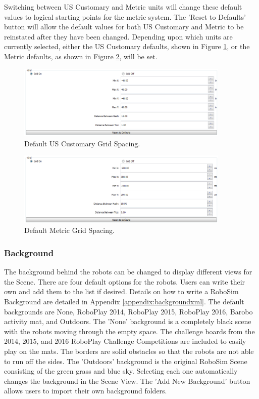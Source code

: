 \documentclass{article}
\begin{document}
Switching between US Customary and Metric units will change these default values
to logical starting points for the metric system.  The 'Reset to Defaults'
button will allow the default values for both US Customary and Metric to be
reinstated after they have been changed.  Depending upon which units are
currently selected, either the US Customary defaults, shown in Figure
\ref{fig:grid_us}, or the Metric defaults, as shown in Figure
\ref{fig:grid_metric}, will be set.
\begin{figure}[H]
	\begin{center}
		\includegraphics[width=4in]{pictures/gui_grid_us}
	\end{center}
	\caption{Default US Customary Grid Spacing.}
	\label{fig:grid_us}
\end{figure}
\begin{figure}[H]
	\begin{center}
		\includegraphics[width=4in]{pictures/gui_grid_si}
	\end{center}
	\caption{Default Metric Grid Spacing.}
	\label{fig:grid_metric}
\end{figure}

\subsubsection{Background}
The background behind the robots can be changed to display different views for
the Scene.  There are four default options for the robots.  Users can write
their own and add them to the list if desired.  Details on how to write a
RoboSim Background are detailed in Appendix \ref{appendix:backgroundxml}.  The
default backgrounds are None, RoboPlay 2014, RoboPlay 2015, RoboPlay 2016,
Barobo activity mat, and Outdoors.  The 'None' background is a completely black
scene with the robots moving through the empty space.  The challenge boards from
the 2014, 2015, and 2016 RoboPlay Challenge Competitions are included to easily
play on the mats.  The borders are solid obstacles so that the robots are not
able to run off the sides.  The 'Outdoors' background is the original RoboSim
Scene consisting of the green grass and blue sky.  Selecting each one
automatically changes the background in the Scene View.  The 'Add New
Background' button allows users to import their own background folders.
\end{document}
